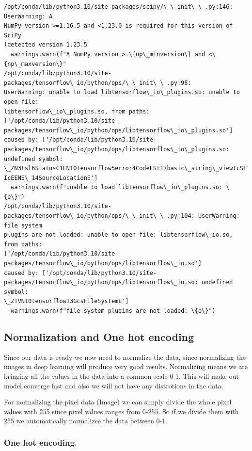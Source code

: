 \documentclass[11pt]{article}
\begin{document}
    \begin{Verbatim}[commandchars=\\\{\}]
/opt/conda/lib/python3.10/site-packages/scipy/\_\_init\_\_.py:146: UserWarning: A
NumPy version >=1.16.5 and <1.23.0 is required for this version of SciPy
(detected version 1.23.5
  warnings.warn(f"A NumPy version >=\{np\_minversion\} and <\{np\_maxversion\}"
/opt/conda/lib/python3.10/site-packages/tensorflow\_io/python/ops/\_\_init\_\_.py:98:
UserWarning: unable to load libtensorflow\_io\_plugins.so: unable to open file:
libtensorflow\_io\_plugins.so, from paths: ['/opt/conda/lib/python3.10/site-
packages/tensorflow\_io/python/ops/libtensorflow\_io\_plugins.so']
caused by: ['/opt/conda/lib/python3.10/site-
packages/tensorflow\_io/python/ops/libtensorflow\_io\_plugins.so: undefined symbol:
\_ZN3tsl6StatusC1EN10tensorflow5error4CodeESt17basic\_string\_viewIcSt11char\_traits
IcEENS\_14SourceLocationE']
  warnings.warn(f"unable to load libtensorflow\_io\_plugins.so: \{e\}")
/opt/conda/lib/python3.10/site-
packages/tensorflow\_io/python/ops/\_\_init\_\_.py:104: UserWarning: file system
plugins are not loaded: unable to open file: libtensorflow\_io.so, from paths:
['/opt/conda/lib/python3.10/site-
packages/tensorflow\_io/python/ops/libtensorflow\_io.so']
caused by: ['/opt/conda/lib/python3.10/site-
packages/tensorflow\_io/python/ops/libtensorflow\_io.so: undefined symbol:
\_ZTVN10tensorflow13GcsFileSystemE']
  warnings.warn(f"file system plugins are not loaded: \{e\}")
    \end{Verbatim}

    \hypertarget{normalization-and-one-hot-encoding}{%
\subsection{Normalization and One hot
encoding}\label{normalization-and-one-hot-encoding}}

Since our data is ready we now need to normalize the data, since
normalizing the images in deep learning will produce very good results.
Normalizing means we are bringing all the values in the data into a
common scale 0-1. This will make out model converge fast and also we
will not have any distrotions in the data.

For normalizing the pixel data (Image) we can simply divide the whole
pixel values with 255 since pixel values ranges from 0-255. So if we
divide them with 255 we automatically normalizee the data between 0-1.

\hypertarget{one-hot-encoding.}{%
\subsubsection{One hot encoding.}\label{one-hot-encoding.}}
\end{document}
